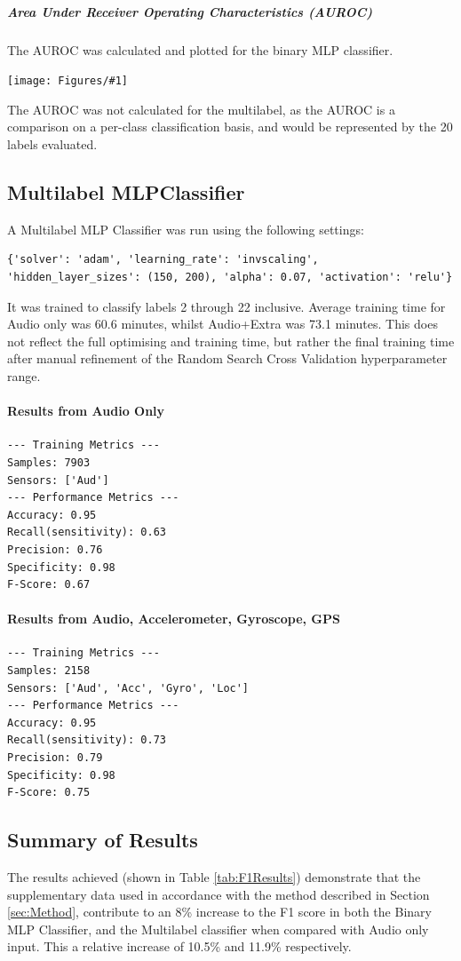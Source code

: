 \documentclass{UoNMCHA}
\newcommand{\sref}[1] {Section \ref{#1}}
\newcommand{\tref}[1] {Table \ref{#1}}
\newcommand{\fFigure}[3]{
        \begin{center}  
            \texttt{[image: Figures/\#1]}  
        \captionof{figure}{#2}
            \label{#1}
        \end{center}
}
\numberwithin{equation}{section}
\begin{document}
\subparagraph{Area Under Receiver Operating Characteristics (AUROC)}
The AUROC was calculated and plotted for the binary MLP classifier.
\fFigure{both_ROC.png}{ROCs for Audio, Audio+Extra}{1}

The AUROC was not calculated for the multilabel, as the AUROC is a comparison on a per-class classification basis, and would be represented by the 20 labels evaluated.

\subsection{Multilabel MLPClassifier}

A Multilabel MLP Classifier was run using the following settings:
\begin{lstlisting}[breaklines=true]
    {'solver': 'adam', 'learning_rate': 'invscaling', 'hidden_layer_sizes': (150, 200), 'alpha': 0.07, 'activation': 'relu'}
\end{lstlisting}
It was trained to classify labels 2 through 22 inclusive. Average training time for Audio only was 60.6 minutes, whilst Audio+Extra was 73.1 minutes. This does not reflect the full optimising and training time, but rather the final training time after manual refinement of the Random Search Cross Validation hyperparameter range.

\paragraph{Results from Audio Only}
\begin{lstlisting}
--- Training Metrics ---
Samples: 7903
Sensors: ['Aud']
--- Performance Metrics ---
Accuracy: 0.95
Recall(sensitivity): 0.63
Precision: 0.76
Specificity: 0.98
F-Score: 0.67
\end{lstlisting}

\paragraph{Results from Audio, Accelerometer, Gyroscope, GPS}
\begin{lstlisting}
--- Training Metrics ---
Samples: 2158
Sensors: ['Aud', 'Acc', 'Gyro', 'Loc']
--- Performance Metrics ---
Accuracy: 0.95
Recall(sensitivity): 0.73
Precision: 0.79
Specificity: 0.98
F-Score: 0.75

\end{lstlisting}

\subsection{Summary of Results}
The results achieved (shown in \tref{tab:F1Results}) demonstrate that the supplementary data used in accordance with the method described in \sref{sec:Method}, contribute to an 8\% increase to the F1 score in both the Binary MLP Classifier, and the Multilabel classifier when compared with Audio only input. This a relative increase of 10.5\% and 11.9\% respectively. 
\end{document}
